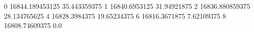 0 16844.189453125 35.443359375
1 16840.6953125 31.94921875
2 16836.880859375 28.134765625
4 16828.3984375 19.65234375
6 16816.3671875 7.62109375
8 16808.74609375 0.0
